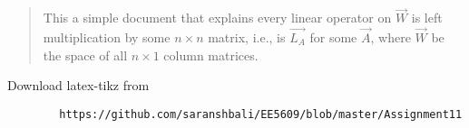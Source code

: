 \documentclass[journal,12pt,twocolumn]{IEEEtran}
\begin{document}
	\maketitle
	\newpage
	\bigskip
	\renewcommand{\thefigure}{\theenumi}
	\renewcommand{\thetable}{\theenumi}
	\begin{abstract}
		This a simple document that explains every linear operator on $\vec{W}$ is left multiplication by some $n\times n$ matrix, i.e., is $\vec{L_{A}}$ for some $\vec{A}$, where $\vec{W}$ be the space of all $n \times 1$ column matrices.
	\end{abstract}
	Download latex-tikz from
	\begin{lstlisting}
		https://github.com/saranshbali/EE5609/blob/master/Assignment11
	\end{lstlisting}
\end{document}
